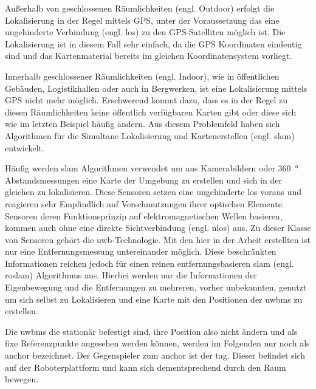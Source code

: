 Außerhalb von geschlossenen Räumlichkeiten (engl. Outdoor) erfolgt die Lokalisierung in der Regel mittels GPS, unter der Voraussetzung das eine ungehinderte Verbindung (engl. \acrfull{los}) zu den GPS-Satelliten möglich ist. Die Lokalisierung ist in diesem Fall sehr einfach, da die GPS Koordinaten eindeutig sind und das Kartenmaterial bereits im gleichen Koordinatensystem vorliegt.

Innerhalb geschlossener Räumlichkeiten (engl. Indoor), wie in öffentlichen Gebäuden, Logistikhallen oder auch in Bergwerken, ist eine Lokalisierung mittels GPS nicht mehr möglich. Erschwerend kommt dazu, dass es in der Regel zu diesen Räumlichkeiten keine öffentlich verfügbaren Karten gibt oder diese sich wie im letzten Beispiel häufig ändern. Aus diesem Problemfeld haben sich Algorithmen für die Simultane Lokalisierung und Kartenerstellen (engl. \Gls{slam}) entwickelt.

Häufig werden \Gls{slam} Algorithmen verwendet um aus Kamerabildern oder \SI{360}{\degree} Abstandsmessungen eine Karte der Umgebung zu erstellen und sich in der gleichen zu lokalisieren. Diese Sensoren setzen eine ungehinderte \Gls{los} voraus und reagieren sehr Empfindlich auf Verschmutzungen ihrer optischen Elemente. Sensoren deren Funktionsprinzip auf elektromagnetischen Wellen basieren, kommen auch ohne eine direkte Sichtverbindung (engl. \Gls{nlos}) aus. Zu dieser Klasse von Sensoren gehört die \Gls{uwb}-Technologie. Mit den hier in der Arbeit erstellten  ist nur eine Entfernungsmessung untereinander möglich. Diese beschränkten Informationen reichen jedoch für einen reinen entfernungsbasieren \Gls{slam} (engl. \gls{roslam}) Algorithmus aus. Hierbei werden nur die Informationen der Eigenbewegung und die Entfernungen zu mehreren, vorher unbekannten,  genutzt um sich selbst zu Lokalisieren und eine Karte mit den Positionen der \Glspl{uwbm} zu erstellen.

Die \Glspl{uwbm} die stationär befestigt sind, ihre Position also nicht ändern und als fixe Referenzpunkte angesehen werden können, werden im Folgenden nur noch als \Gls{anchor} bezeichnet. Der Gegenspieler zum \Gls{anchor} ist der \Gls{tag}. Dieser befindet sich auf der Roboterplattform und kann sich dementsprechend durch den Raum bewegen.




\begin{comment}
------------------------------------------------------------------------------------------
\end{comment}



